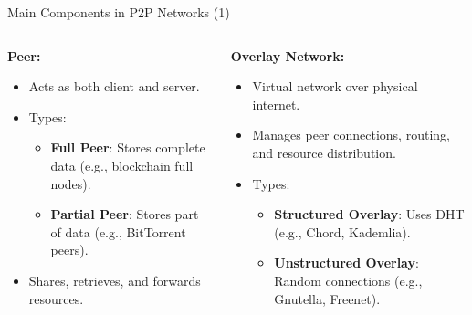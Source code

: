 \documentclass[aspectratio=169, table]{beamer}
\begin{document}
\begin{frame}{Main Components in P2P Networks (1)}
	\vspace{20pt}
	\begin{columns}[t]
		
		\begin{column}{0.5\textwidth}
			\textbf{Peer:}  
			\begin{itemize}
				\item Acts as both client and server.
				\item Types:
				\begin{itemize}
					\item \textbf{Full Peer}: Stores complete data (e.g., blockchain full nodes).
					\item \textbf{Partial Peer}: Stores part of data (e.g., BitTorrent peers).
				\end{itemize}
				\item Shares, retrieves, and forwards resources.
			\end{itemize}
		\end{column}
		
		\begin{column}{0.5\textwidth}
			\textbf{Overlay Network:}  
			\begin{itemize}
				\item Virtual network over physical internet.
				\item Manages peer connections, routing, and resource distribution.
				\item Types:
				\begin{itemize}
					\item \textbf{Structured Overlay}: Uses DHT (e.g., Chord, Kademlia).
					\item \textbf{Unstructured Overlay}: Random connections (e.g., Gnutella, Freenet).
				\end{itemize}
			\end{itemize}
		\end{column}
		
	\end{columns}
\end{frame}
\end{document}
